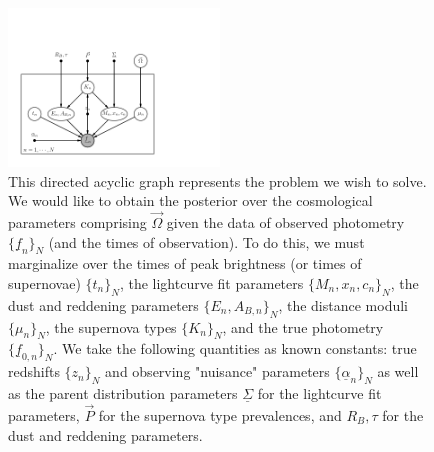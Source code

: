 \documentclass[12pt, onecolumn]{emulateapj}
\newcommand{\textul}{\underline}
\begin{document}
\begin{figure}
\vspace{0.5cm}
\begin{center}
\includegraphics[width=0.5\textwidth]{sn-draft.png}
\caption{This directed acyclic graph represents the problem we wish to solve.  We would like to obtain the posterior over the cosmological parameters comprising $\vec{\Omega}$ given the data of observed photometry $\{\textul{f}_{n}\}_{N}$ (and the times of observation).  To do this, we must marginalize over the times of peak brightness (or times of supernovae) $\{t_{n}\}_{N}$, the lightcurve fit parameters $\{M_{n},x_{n},c_{n}\}_{N}$, the dust and reddening parameters $\{E_{n},A_{B,n}\}_{N}$, the distance moduli $\{\mu_{n}\}_{N}$, the supernova types $\{K_{n}\}_{N}$, and the true photometry $\{\textul{f}_{0,n}\}_{N}$.  We take the following quantities as known constants: true redshifts $\{z_{n}\}_{N}$ and observing "nuisance" parameters $\{\textul{\alpha}_{n}\}_{N}$ as well as the parent distribution parameters $\textul{\Sigma}$ for the lightcurve fit parameters, $\vec{P}$ for the supernova type prevalences, and $R_{B},\tau$ for the dust and reddening parameters.}
\label{fig:pgm}
\end{center}
\end{figure}
%
%
\end{document}
